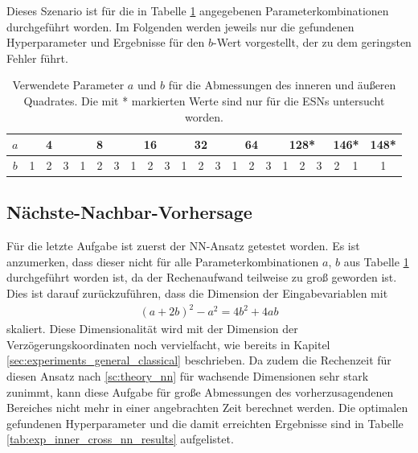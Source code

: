 Dieses Szenario ist für die in Tabelle \ref{tab:exp_inner_cross_pred_parameter} angegebenen Parameterkombinationen durchgeführt worden. Im Folgenden werden jeweils nur die gefundenen Hyperparameter und Ergebnisse für den $b$-Wert vorgestellt, der zu dem geringsten Fehler führt.

\begin{table}[h]
	\centering
	\begin{tabular}{cccc|ccc|ccc|ccc|ccc|ccc|cc|c}
		\hline
		$a$ & \multicolumn{3}{c|}{4} & \multicolumn{3}{c|}{8} & \multicolumn{3}{c|}{16} & \multicolumn{3}{c|}{32} & \multicolumn{3}{c|}{64} & \multicolumn{3}{c|}{128*} & \multicolumn{2}{c|}{146*} & 148* \\
		\hline
		$b$ & 1 & 2 & 3 & 1 & 2 & 3 & 1 & 2 & 3 & 1 & 2 & 3 & 1 & 2 & 3 & 1 & 2 & 3 & 2 & 1 & 1 \\
		\hline
	\end{tabular} 
	\caption{Verwendete Parameter $a$ und $b$ für die Abmessungen des inneren und äußeren Quadrates. Die mit * markierten Werte sind nur für die \textsc{ESN}s untersucht worden.}
	\label{tab:exp_inner_cross_pred_parameter}
\end{table} 

\subsection{Nächste-Nachbar-Vorhersage}
Für die letzte Aufgabe ist zuerst der \textsc{NN}-Ansatz getestet worden. Es ist anzumerken, dass dieser nicht für alle Parameterkombinationen $a$, $b$ aus Tabelle \ref{tab:exp_inner_cross_pred_parameter} durchgeführt worden ist, da der Rechenaufwand teilweise zu groß geworden ist. Dies ist darauf zurückzuführen, dass die Dimension der Eingabevariablen mit
\begin{align*}
(a+2b)^2-a^2 = 4b^2+4ab
\end{align*}
skaliert. Diese Dimensionalität wird mit der Dimension der Verzögerungskoordinaten noch vervielfacht, wie bereits in Kapitel \ref{sec:experiments_general_classical} beschrieben. Da zudem die Rechenzeit für diesen Ansatz nach \ref{sc:theory_nn} für wachsende Dimensionen sehr stark zunimmt, kann diese Aufgabe für große Abmessungen des vorherzusagendenen Bereiches nicht mehr in einer angebrachten Zeit berechnet werden.
Die optimalen gefundenen Hyperparameter und die damit erreichten Ergebnisse sind in Tabelle \ref{tab:exp_inner_cross_nn_results} aufgelistet.

